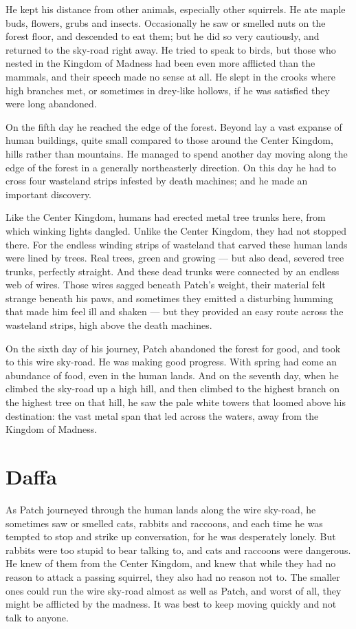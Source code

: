 \documentclass[ebook,oneside,openany,17pt]{memoir}
\renewcommand{\thechapter}{\Roman{chapter}}
\newcounter{sections}
\newcommand{\sections}[1]{%
  \section*{#1}
  \addtocounter{sections}{1}%
  \pdfbookmark[1]{#1}{section.\thechapter.\thesections}}
\begin{document}
He kept his distance from other animals, especially other
squirrels. He ate maple buds, flowers, grubs and insects. Occasionally
he saw or smelled nuts on the forest floor, and descended to eat them;
but he did so very cautiously, and returned to the sky-road right
away. He tried to speak to birds, but those who nested in the Kingdom
of Madness had been even more afflicted than the mammals, and their
speech made no sense at all. He slept in the crooks where high
branches met, or sometimes in drey-like hollows, if he was satisfied
they were long abandoned.

On the fifth day he reached the edge of the forest. Beyond lay a vast
expanse of human buildings, quite small compared to those around the
Center Kingdom, hills rather than mountains. He managed to spend
another day moving along the edge of the forest in a generally
northeasterly direction. On this day he had to cross four wasteland
strips infested by death machines; and he made an important discovery.

Like the Center Kingdom, humans had erected metal tree trunks here,
from which winking lights dangled. Unlike the Center Kingdom, they had
not stopped there. For the endless winding strips of wasteland that
carved these human lands were lined by trees. Real trees, green and
growing — but also dead, severed tree trunks, perfectly straight. And
these dead trunks were connected by an endless web of wires. Those
wires sagged beneath Patch’s weight, their material felt strange
beneath his paws, and sometimes they emitted a disturbing humming that
made him feel ill and shaken — but they provided an easy route across
the wasteland strips, high above the death machines.

On the sixth day of his journey, Patch abandoned the forest for good,
and took to this wire sky-road. He was making good progress. With
spring had come an abundance of food, even in the human lands. And on
the seventh day, when he climbed the sky-road up a high hill, and then
climbed to the highest branch on the highest tree on that hill, he saw
the pale white towers that loomed above his destination: the vast
metal span that led across the waters, away from the Kingdom of
Madness.


\sections{Daffa}

As Patch journeyed through the human lands along the wire sky-road, he
sometimes saw or smelled cats, rabbits and raccoons, and each time he
was tempted to stop and strike up conversation, for he was desperately
lonely. But rabbits were too stupid to bear talking to, and cats and
raccoons were dangerous. He knew of them from the Center Kingdom, and
knew that while they had no reason to attack a passing squirrel, they
also had no reason not to. The smaller ones could run the wire
sky-road almost as well as Patch, and worst of all, they might be
afflicted by the madness. It was best to keep moving quickly and not
talk to anyone.
\end{document}
